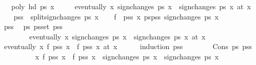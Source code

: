\begin{isabellebody}
\ \ \ {\isachardoublequoteopen}poly\ {\isacharparenleft}hd\ ps{\isacharparenright}\ x\ {\isasymnoteq}\ {}{\isachardoublequoteclose}\isanewline
\ \ \ {\isachardoublequoteopen}eventually\ {\isacharparenleft}{\isasymlambda}x{\isachardot}\ sign{\isacharunderscore}changes\ ps\ x\ {\isacharequal}\ sign{\isacharunderscore}changes\ ps\ x\ {\isacharparenleft}at\ x\isanewline
%
\isadelimproof
%
\endisadelimproof
%
\isatagproof
{}\isamarkupfalse%
{\isacharminus}\isanewline
\ \ \isamarkupfalse%
\ {\isacharquery}pss\ {\isacharequal}\ {\isachardoublequoteopen}split{\isacharunderscore}sign{\isacharunderscore}changes\ ps\ x\isanewline
\ \ \isamarkupfalse%
\ {\isacharquery}f\ {\isacharequal}\ {\isachardoublequoteopen}{\isasymlambda}pss\ x{\isachardot}\ {\isasymSum}ps{\isacharprime}{\isasymleftarrow}pss{\isachardot}\ sign{\isacharunderscore}changes\ ps{\isacharprime}\ x{\isachardoublequoteclose}\isanewline
\ \ \isacommand{{\isacharbraceleft}}\isamarkupfalse%
\isanewline
\ \ \ \ \isamarkupfalse%
\ pss\ \isamarkupfalse%
\ {\isachardoublequoteopen}{\isasymAnd}ps{\isacharprime}{\isachardot}\ ps{\isacharprime}{\isasymin}set\ pss\ {\isasymLongrightarrow}\ \isanewline
\ \ \ \ \ \ \ \ eventually\ {\isacharparenleft}{\isasymlambda}x{\isachardot}\ sign{\isacharunderscore}changes\ ps{\isacharprime}\ x\ {\isacharequal}\ sign{\isacharunderscore}changes\ ps{\isacharprime}\ x\ {\isacharparenleft}at\ x\isanewline
\ \ \ \ \isamarkupfalse%
\ {\isachardoublequoteopen}eventually\ {\isacharparenleft}{\isasymlambda}x{\isachardot}\ {\isacharquery}f\ pss\ x\ {\isacharequal}\ {\isacharquery}f\ pss\ x\ {\isacharparenleft}at\ x\isanewline
\ \ \ \ \isamarkupfalse%
\ {\isacharparenleft}induction\ pss{\isacharparenright}\isanewline
\ \ \ \ \ \ \isamarkupfalse%
\ {\isacharparenleft}Cons\ ps{\isacharprime}\ pss{\isacharparenright}\isanewline
\ \ \ \ \ \ \ \ \isamarkupfalse%
\ {\isachardoublequoteopen}{\isasymforall}x{\isachardot}\ {\isacharquery}f\ pss\ x\ {\isacharequal}\ {\isacharquery}f\ pss\ x\ {\isasymand}\ sign{\isacharunderscore}changes\ ps{\isacharprime}\ x\ {\isacharequal}\ sign{\isacharunderscore}changes\ ps{\isacharprime}\ x\ \isanewline

\end{isabellebody}
